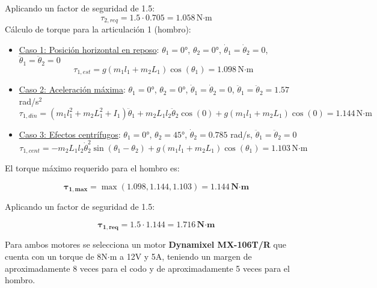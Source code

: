 Aplicando un factor de seguridad de 1.5:
\begin{equation}
\tau_{2,req} = 1.5 \cdot 0.705 = 1.058 \, \text{N·m}
\end{equation}
Cálculo de torque para la articulación 1 (hombro):
\begin{itemize}
    \item \underline{Caso 1: Posición horizontal en reposo}: $\theta_1 = 0°$, $\theta_2 = 0°$, $\dot{\theta}_1 = \dot{\theta}_2 = 0$, $\ddot{\theta}_1 = \ddot{\theta}_2 = 0$ \\
        
        \begin{equation}
        \tau_{1,est} = g(m_1l_1 + m_2L_1)\cos(\theta_1) 
        = 1.098 \, \text{N·m}
        \end{equation}

    \item \underline{Caso 2: Aceleración máxima}: $\theta_1 = 0°$, $\theta_2 = 0°$, $\dot{\theta}_1 = \dot{\theta}_2 = 0$, $\ddot{\theta}_1 = \ddot{\theta}_2 = 1.57$ rad/s$^2$\\
        
        \begin{equation}
        \tau_{1,din} = (m_1l_1^2 + m_2L_1^2 + I_1)\ddot{\theta}_1 + m_2L_1l_2\ddot{\theta}_2\cos(0) + g(m_1l_1 + m_2L_1)\cos(0) = 1.144 \, \text{N·m}
        \end{equation}

    \item \underline{Caso 3: Efectos centrífugos}: $\theta_1 = 0°$, $\theta_2 = 45°$, $\dot{\theta}_2 = 0.785$ rad/s, $\ddot{\theta}_1 = \ddot{\theta}_2 = 0$\\
        
        \begin{equation}
        \tau_{1,cent} = - m_2L_1l_2\dot{\theta}_2^2\sin(\theta_1 - \theta_2) + g(m_1l_1 + m_2L_1)\cos(\theta_1)
        = 1.103 \, \text{N·m}
        \end{equation}
\end{itemize}

El torque máximo requerido para el hombro es:

\begin{equation}
\mathbf{\tau_{1,max}} = \max(1.098, 1.144, 1.103) = \mathbf{1.144 \, \textbf{N·m} }
\end{equation}

Aplicando un factor de seguridad de 1.5:

\begin{equation}
\mathbf{\tau_{1,req}} = 1.5 \cdot 1.144 = \mathbf{1.716 \, \textbf{N·m} }
\end{equation}

Para ambos motores se selecciona un motor \textbf{Dynamixel MX-106T/R} que cuenta con un torque de 8N$\cdot$m a 12V y 5A, teniendo un margen de aproximadamente 8 veces para el codo y de aproximadamente 5 veces para el hombro.
